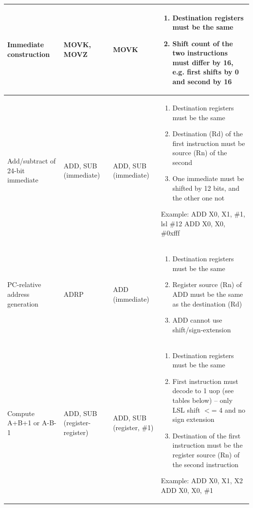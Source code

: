 \documentclass{article}
\begin{document}
\begin{longtable}{|p{2in}|p{1in}|p{1in}|p{2in}|}
Immediate construction &
MOVK, MOVZ &
MOVK &
\parbox{2in}{
  \begin{enumerate}
  \item Destination registers must be the same 
  \item Shift count of the two instructions must differ by 16, e.g. first shifts by 0 and second by 16
\end{enumerate}} \\
\hline

Add/subtract of 24-bit immediate &
ADD, SUB (immediate) &
ADD, SUB (immediate) &
\parbox{2in}{
  \begin{enumerate}
  \item Destination registers must be the same
  \item Destination (Rd) of the first instruction must be source (Rn) of the second
  \item One immediate must be shifted by 12 bits, and the other one not
\end{enumerate}
Example: \\
ADD X0, X1, \#1, lsl \#12 \\
ADD X0, X0, \#0xfff} \\
\hline

PC-relative address generation &
ADRP &
ADD (immediate) &
\parbox{2in}{
  \begin{enumerate}
  \item Destination registers must be the same
  \item Register source (Rn) of ADD must be the same as the destination (Rd)
  \item ADD cannot use shift/sign-extension
\end{enumerate}} \\
\hline

Compute A+B+1 or A-B-1 &
ADD, SUB (register-register) &
ADD, SUB (register, \#1) &
\parbox{2in}{
  \begin{enumerate}
  \item Destination registers must be the same
  \item First instruction must decode to 1 uop (see tables below) – only LSL shift $<$= 4 and no sign extension
  \item Destination of the first instruction must be the register source (Rn) of the second instruction
  \end{enumerate}
Example: \\
ADD X0, X1, X2\\
ADD X0, X0, \#1}
\\ \hline


\end{longtable}
\end{document}
